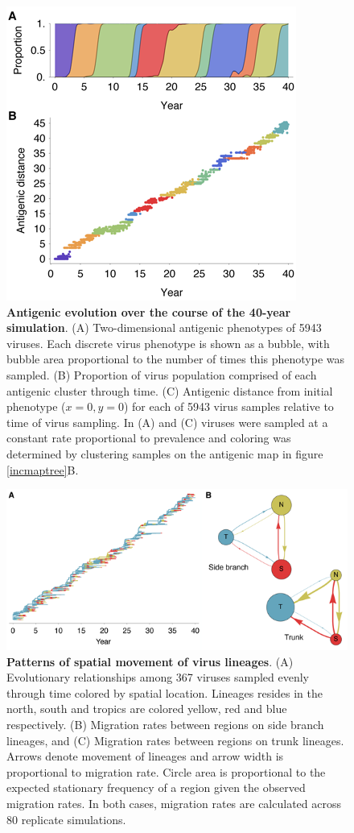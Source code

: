 \documentclass[11pt,oneside,letterpaper]{article}
\begin{document}
\pagebreak

\begin{figure}[H]
	\centering
	\includegraphics{figures/phenotypes}
	\caption{\textbf{Antigenic evolution over the course of the 40-year simulation}. (A) Two-dimensional antigenic phenotypes of 5943 viruses.  Each discrete virus phenotype is shown as a bubble, with bubble area proportional to the number of times this phenotype was sampled. (B) Proportion of virus population comprised of each antigenic cluster through time.  (C) Antigenic distance from initial phenotype ($x=0,y=0$) for each of 5943 virus samples relative to time of virus sampling. In (A) and (C) viruses were sampled at a constant rate proportional to prevalence and coloring was determined by clustering samples on the antigenic map in figure \ref{incmaptree}B.}
	\label{phenotypes}
\end{figure}

\begin{figure}[H]
	\centering
	\includegraphics{figures/spatial}
	\caption{\textbf{Patterns of spatial movement of virus lineages}. (A) Evolutionary relationships among 367 viruses sampled evenly through time colored by spatial location. Lineages resides in the north, south and tropics are colored yellow, red and blue respectively. (B) Migration rates between regions on side branch lineages, and (C) Migration rates between regions on trunk lineages. Arrows denote movement of lineages and arrow width is proportional to migration rate. Circle area is proportional to the expected stationary frequency of a region given the observed migration rates.  In both cases, migration rates are calculated across 80 replicate simulations.}
	\label{spatial}
\end{figure}
\end{document}
